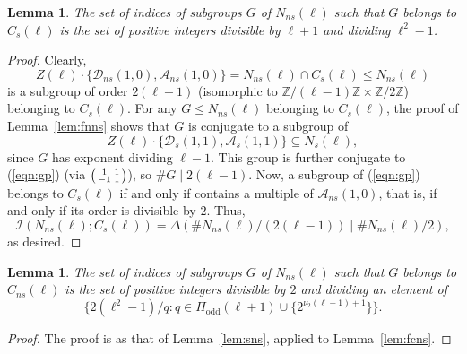\documentclass[table,dvipsnames]{amsart}
\newcommand{\Z}{\mathbb{Z}}
\newcommand{\I}{\mathcal{I}}
\newcommand{\odd}{\mathrm{odd}}
\newcommand{\smallmat}[4]{\begin{psmallmatrix}#1&#2\\#3&#4\end{psmallmatrix}}
\newtheorem{lemma}[theorem]{Lemma}
\numberwithin{equation}{section}
\newcommand{\s}{\textit{s}}
\newcommand{\ns}{\textit{ns}}
\newcommand{\Cs}{C_\s}
\newcommand{\Cns}{C_\ns}
\newcommand{\Ns}{N_\s}
\newcommand{\Nns}{N_\ns}
\begin{document}
\begin{lemma}
\label{lem:ncs}
The set of indices of subgroups $G$ of $\Nns(\ell)$ such that $G$ belongs to $\Cs(\ell)$ is the set of positive integers divisible by $\ell+1$ and dividing $\ell^2-1$.
\end{lemma}
\begin{proof}
Clearly,
\begin{equation}
\label{eqn:gp}
Z(\ell)\cdot\{\mathcal{D}_\ns(1,0),\mathcal{A}_\ns(1,0)\}=\Nns(\ell)\cap\Cs(\ell)\le\Nns(\ell)
\end{equation}
is a subgroup of order $2(\ell-1)$ (isomorphic to $\Z/(\ell-1)\Z\times\Z/2\Z$) belonging to $\Cs(\ell)$. For any $G\le\Nns(\ell)$ belonging to $\Cs(\ell)$, the proof of Lemma~\ref{lem:fnns} shows that $G$ is conjugate to a subgroup of
\begin{equation*}
Z(\ell)\cdot\{\mathcal{D}_\s(1,1),\mathcal{A}_\s(1,1)\}\subseteq\Ns(\ell),
\end{equation*}
since $G$ has exponent dividing $\ell-1$. This group is further conjugate to (\ref{eqn:gp}) (via $\smallmat{1}{1}{-1}{1}$), so $\#G\mid 2(\ell-1)$. Now, a subgroup of (\ref{eqn:gp}) belongs to $\Cs(\ell)$ if and only if contains a multiple of $\mathcal{A}_\ns(1,0)$, that is, if and only if its order is divisible by $2$. Thus,
\begin{equation*}
\I(\Nns(\ell);\Cs(\ell))=\Delta(\#\Nns(\ell)/(2(\ell-1))\mid\#\Nns(\ell)/2),
\end{equation*}
as desired.
\end{proof}

\begin{lemma}
\label{lem:ncns}
The set of indices of subgroups $G$ of $\Nns(\ell)$ such that $G$ belongs to $\Cns(\ell)$ is the set of positive integers divisible by $2$ and dividing an element of
\begin{equation*}
\{2(\ell^2-1)/q:q\in\Pi_\odd(\ell+1)\cup\{2^{\nu_2(\ell-1)+1}\}\}.
\end{equation*}
\end{lemma}
\begin{proof}
The proof is as that of Lemma~\ref{lem:sns}, applied to Lemma~\ref{lem:fcns}.
\end{proof}
\end{document}
